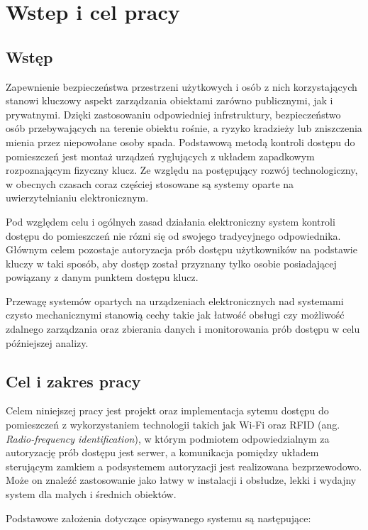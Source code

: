\chapter{Wstep i cel pracy}

	\section{Wstęp}

		Zapewnienie bezpieczeństwa przestrzeni użytkowych i osób z nich korzystających stanowi kluczowy aspekt zarządzania obiektami zarówno publicznymi, jak i prywatnymi. Dzięki zastosowaniu odpowiedniej infrstruktury, bezpieczeństwo osób przebywających na terenie obiektu rośnie, a ryzyko kradzieży lub zniszczenia mienia przez niepowołane osoby spada. Podstawową metodą kontroli dostępu do pomieszczeń jest montaż urządzeń ryglujących z układem zapadkowym rozpoznającym fizyczny klucz. Ze względu na postępujący rozwój technologiczny, w obecnych czasach coraz częściej stosowane są systemy oparte na uwierzytelnianiu elektronicznym.

		Pod względem celu i ogólnych zasad działania elektroniczny system kontroli dostępu do pomieszczeń nie rózni się od swojego tradycyjnego odpowiednika. Głównym celem pozostaje autoryzacja prób dostępu użytkowników na podstawie kluczy w taki sposób, aby dostęp został przyznany tylko osobie posiadającej powiązany z danym punktem dostępu klucz.

		Przewagę systemów opartych na urządzeniach elektronicznych nad systemami czysto mechanicznymi stanowią cechy takie jak łatwość obsługi czy możliwość zdalnego zarządzania oraz zbierania danych i monitorowania prób dostępu w celu późniejszej analizy.

	\section{Cel i zakres pracy}

		Celem niniejszej pracy jest projekt oraz implementacja sytemu dostępu do pomieszczeń z wykorzystaniem technologii takich jak Wi-Fi oraz RFID (ang. \textit{Radio-frequency identification}), w którym podmiotem odpowiedzialnym za autoryzację prób dostępu jest serwer, a komunikacja pomiędzy układem sterującym zamkiem a podsystemem autoryzacji jest realizowana bezprzewodowo. Może on znaleźć zastosowanie jako łatwy w instalacji i obsłudze, lekki i wydajny system dla małych i średnich obiektów.

		Podstawowe założenia dotyczące opisywanego systemu są następujące:

